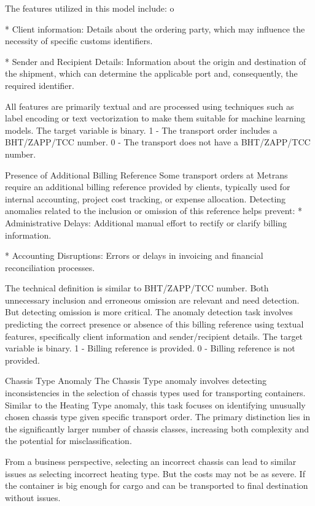 The features utilized in this model include:
\begitems \style o

* Client information: Details about the ordering party, which may influence the necessity of specific customs identifiers.

* Sender and Recipient Details: Information about the origin and destination of the shipment, which can determine the applicable port and, consequently, the required identifier.
\enditems

All features are primarily textual and are processed using techniques such as label encoding or text vectorization to make them suitable for machine learning models. The target variable is binary. 1 - The transport order includes a BHT/ZAPP/TCC number. 0 - The transport does not have a BHT/ZAPP/TCC number.

\sec Presence of Additional Billing Reference
Some transport orders at Metrans require an additional billing reference provided by clients, typically used for internal accounting, project cost tracking, or expense allocation. Detecting anomalies related to the inclusion or omission of this reference helps prevent:
\begitems
* Administrative Delays: Additional manual effort to rectify or clarify billing information.

* Accounting Disruptions: Errors or delays in invoicing and financial reconciliation processes.
\enditems

The technical definition is similar to BHT/ZAPP/TCC number. Both unnecessary inclusion and erroneous omission are relevant and need detection. But detecting omission is more critical. The anomaly detection task involves predicting the correct presence or absence of this billing reference using textual features, specifically client information and sender/recipient details. The target variable is binary. 1 - Billing reference is provided. 0 - Billing reference is not provided.

\sec Chassis Type Anomaly
The Chassis Type anomaly involves detecting inconsistencies in the selection of chassis types used for transporting containers. Similar to the Heating Type anomaly, this task focuses on identifying unusually chosen chassis type given specific transport order. The primary distinction lies in the significantly larger number of chassis classes, increasing both complexity and the potential for misclassification.

From a business perspective, selecting an incorrect chassis can lead to similar issues as selecting incorrect heating type. But the costs may not be as severe. If the container is big enough for cargo and can be transported to final destination without issues.

